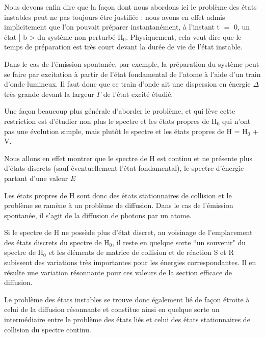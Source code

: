 Nous devons enfin dire que la façon dont nous abordons ici le problème des états instables peut ne pas toujours être justifiée : nous avons en
effet admis implicitement que l'on pouvait préparer instantanément, à l'instant
t $=$ 0, un état | b > du système non perturbé H$_0$. Physiquement, cela veut dire que
le temps de préparation est très court devant la durée de vie de l'état instable.

Dans le cas de l'émission spontanée, par exemple, la préparation du
système peut se faire par excitation à partir de l'état fondamental de l'atome
à l'aide d'un train d'onde lumineux. Il faut donc que ce train d'onde ait une
dispersion en énergie $\Delta$ très grande devant la largeur $\Gamma$ de l'état excité étudié.

Une façon beaucoup plus générale d'aborder le problème, et qui
lève cette restriction est d'étudier non plus le spectre et les états propres
de H$_0$ qui n'ont pas une évolution simple, mais plutôt le spectre et les
états propres de H = H$_0$ + V.

Nous allons en effet montrer que le spectre de H est continu et
ne présente plus d'états discrets (sauf éventuellement l'état fondamental),
le spectre d'énergie partant d'une valeur $E$

\vspace{0.3cm}
\begin{center}
\end{center}

Les états propres de H sont donc des états stationnaires de collision et le problème se ramène à un problème de diffusion. Dans le cas de l'émission spontanée, il s'agit de la diffusion de photons par un atome.

Si le spectre de H ne possède plus d'état discret, au voisinage de
l'emplacement des états discrets du spectre de H$_0$, il reste en quelque sorte
“un souvenir" du spectre de H$_0$ et les éléments de matrice de collision et de
réaction S et R subissent des variations très importantes pour les énergies
correspondantes. Il en résulte une variation résonnante pour ces valeurs de la
section efficace de diffusion.

Le problème des états instables se trouve donc également lié de façon
étroite à celui de la diffusion résonnante et constitue ainsi en quelque sorte
un intermédiaire entre le problème des états liés et celui des états stationnaires de collision du spectre continu.

